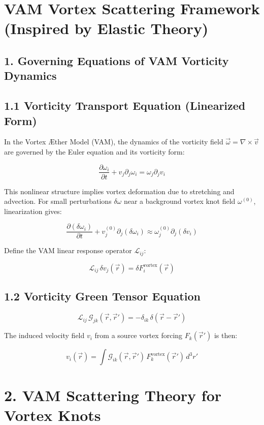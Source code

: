 

\section{VAM Vortex Scattering Framework (Inspired by Elastic Theory)}

\subsection*{1. Governing Equations of VAM Vorticity Dynamics}

\subsection*{1.1 Vorticity Transport Equation (Linearized Form)}

In the Vortex Æther Model (VAM), the dynamics of the vorticity field \(\vec{\omega} = \nabla \times \vec{v}\) are governed by the Euler equation and its vorticity form:

\[
\frac{\partial \omega_i}{\partial t} + v_j \partial_j \omega_i = \omega_j \partial_j v_i
\]

This nonlinear structure implies vortex deformation due to stretching and advection. For small perturbations \(\delta\omega\) near a background vortex knot field \(\omega^{(0)}\), linearization gives:

\[
\frac{\partial (\delta \omega_i)}{\partial t} + v_j^{(0)} \partial_j (\delta \omega_i) \approx \omega_j^{(0)} \partial_j (\delta v_i)
\]

Define the VAM linear response operator \(\mathcal{L}_{ij}\):

\[
\mathcal{L}_{ij} \, \delta v_j(\vec{r}) = \delta F_i^{\text{vortex}}(\vec{r})
\]

\subsection*{1.2 Vorticity Green Tensor Equation}

\[
\mathcal{L}_{ij} \, \mathcal{G}_{jk}(\vec{r}, \vec{r}') = -\delta_{ik} \, \delta(\vec{r} - \vec{r}')
\]

The induced velocity field \(v_i\) from a source vortex forcing \(F_k(\vec{r}')\) is then:

\[
v_i(\vec{r}) = \int \mathcal{G}_{ik}(\vec{r}, \vec{r}') \, F_k^{\text{vortex}}(\vec{r}') \, d^3 r'
\]

\section*{2. VAM Scattering Theory for Vortex Knots}


